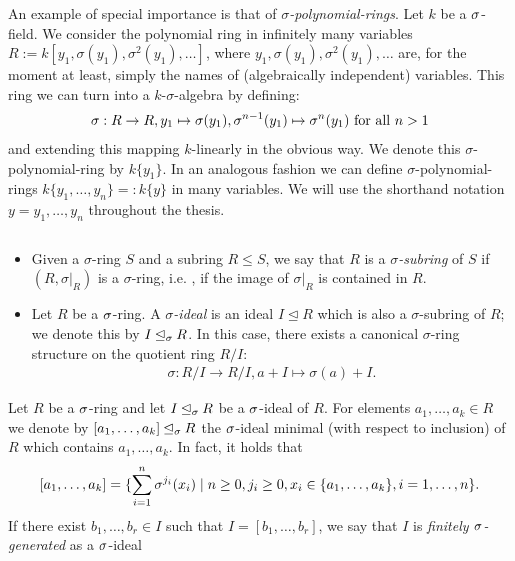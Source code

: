 \begin{ex}
An example of special importance is that of $\sigma$\emph{-polynomial-rings}. 
Let $k$ be a $\sigma$-field. We consider the polynomial ring in infinitely many variables $R:= k[y_1,\sigma(y_1),\sigma^2(y_1),\ldots]$,
 where $y_1,\sigma(y_1),\sigma^2(y_1),\ldots$ are, for the moment at least, simply the names of (algebraically independent) variables.
This ring we can turn into a $k$-$\sigma$-algebra by defining:
\begin{align*} 
\sigma:  R \rightarrow R, y_1 \mapsto \sigma(y_1), \sigma^{n-1}(y_1) \mapsto \sigma^{n}(y_1) \text{ for all } n > 1 
\end{align*}
and extending this mapping $k$-linearly in the obvious way. We denote this $\sigma$-polynomial-ring by $k\{y_1\}$. In an analogous fashion we can define $\sigma$-polynomial-rings $k\{y_1, \ldots, y_n \} =: k\{y\}$ in many variables.
We will use the shorthand notation $y = y_1,\ldots,y_n$ throughout the thesis.
\end{ex}

\begin{defn} $\phantom{}$
\begin{itemize}
\item Given a $\sigma$-ring $S$ and a subring $R \leq S$, we say that $R$ is a $\sigma$\emph{-subring}  of $S$ if $(R,\sigma|_{R})$ is a $\sigma$-ring,
i.e. , if the image of $\sigma|_{R}$ is contained in $R$.
\item Let $R$ be a $\sigma$-ring. A $\sigma$\emph{-ideal}  is an ideal $I \unlhd R$ which is also a $\sigma$-subring of $R$; we denote this by $I \unlhd_{\sigma} R$. In this case, there exists a canonical $\sigma$-ring structure on the quotient ring $R/I$:
\begin{align*} \sigma: R/I \rightarrow R/I, a + I \mapsto \sigma(a) + I. \end{align*}
\end{itemize}
\end{defn}

\begin{defn}
Let $R$ be a $\sigma$-ring and let  $I \unlhd_{\sigma} R$ be a $\sigma$-ideal of $R$. For elements $a_1, \ldots, a_k \in R$ we denote by $[a_1, \ldots, a_k] \unlhd_{\sigma} R$ the $\sigma$-ideal minimal (with respect to inclusion) of $R$ which contains $a_1,\ldots,a_k$. 
In fact, it holds that \[[a_1,\ldots,a_k] = \{ \sum_{i=1}^n \sigma^{j_i}(x_i) \mid n \geq 0, j_i \geq 0, x_i \in \{a_1,\ldots,a_k\}, i=1,\ldots,n \}. \] If there exist $b_1,\ldots,b_r \in I$ such that $I = [b_1,\ldots,b_r]$,
 we say that $I$ is \emph{finitely $\sigma$-generated} as a $\sigma$-ideal 
\end{defn}

